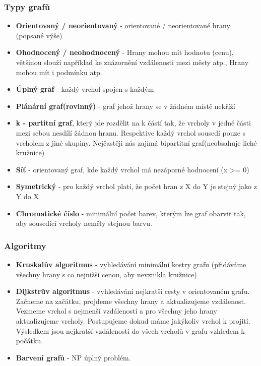\documentclass[10pt,a4paper]{article}
\begin{document}
\subsubsection{Typy grafů}
\begin{itemize}
\item \textbf{Orientovaný / neorientovaný} - orientované / neorientované hrany (popsané výše)
\item \textbf{Ohodnocený / neohodnocený} - Hrany mohou mít hodnotu (cenu), většinou slouží například ke znázornění vzdálenosti mezi městy atp., Hrany mohou mít i podmínku atp.
\item \textbf{Úplný graf} - každý vrchol spojen s každým
\item \textbf{Plánární graf(rovinný)} - graf jehož hrany se v žádném místě nekříží
\item \textbf{k - partitní graf}, který jde rozdělit na k částí tak, že vrcholy v jedné části mezi sebou nesdílí žádnou hranu. Respektive každý vrchol sousedí pouze s vrcholem z jiné skupiny. Nejčastěji nás zajímá bipartitní graf(neobsahuje liché kružnice)
\item \textbf{Síť} - orientovaný graf, kde každý vrchol má nezáporné hodnocení (x >= 0)
\item \textbf{Symetrický} - pro každý vrchol platí, že počet hran z X do Y je stejný jako z Y do X
\item \textbf{Chromatické číslo} - minimální počet barev, kterým lze graf obarvit tak, aby sousedící vrcholy neměly stejnou barvu.
\end{itemize}

\subsubsection{Algoritmy}
\begin{itemize}
\item \textbf{Kruskalův algoritmus} - vyhledávání minimální kostry grafu (přidáváme všechny hrany s co nejnižší cenou, aby nevznikla kružnice)
\item \textbf{Dijkstrův algoritmus} - vyhledávání nejkratší cesty v orientovaném grafu. Začneme na začátku, projdeme všechny hrany a aktualizujeme vzdálenost. Vezmeme vrchol s nejmenší vzdáleností a pro všechny jeho hrany aktualizujeme vrcholy. Postupujeme dokud máme jakýkoliv vrchol k projití. Výsledkem jsou nejkratší vzdálenosti do všech vrcholů v grafu vzhledem k počátku.
\item \textbf{Barvení grafů} - NP úplný problém.
\end{itemize}
\end{document}
